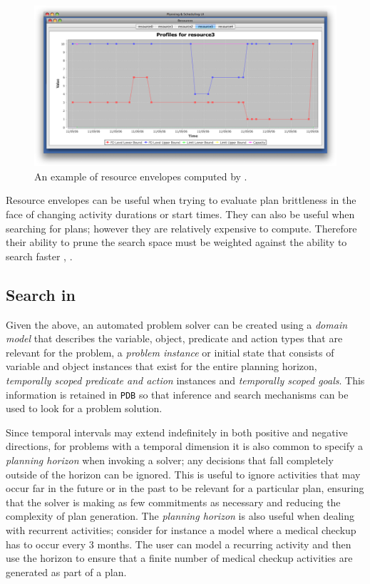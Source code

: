 \begin{figure}
\centering
\includegraphics[scale=0.2]{figs/europa-resource-envelopes.png}
\caption{\small An example of resource envelopes computed by \eu.}
\label{fig:resenvelopes}
\end{figure}

Resource envelopes can be useful when trying to evaluate plan
brittleness in the face of changing activity durations or start
times. They can also be useful when searching for plans; however they
are relatively expensive to compute. Therefore their ability to prune
the search space must be weighted against the ability to search faster
\cite{6007772}, .


\subsection{Search in \eu}
\label{sec:europa:search}

Given the above, an automated problem solver can be created using a
\emph{domain model} that describes the variable, object, predicate and
action types that are relevant for the problem, a \emph{problem
  instance} or initial state that consists of variable and object
instances that exist for the entire planning horizon, \emph{temporally
  scoped predicate and action} instances and \emph{temporally scoped
  goals}. This information is retained in \eus \texttt{PDB} so that
inference and search mechanisms can be used to look for a problem
solution.

Since temporal intervals may extend indefinitely in both positive and
negative directions, for problems with a temporal dimension it is also
common to specify a \emph{planning horizon} when invoking a solver;
any decisions that fall completely outside of the horizon can be
ignored. This is useful to ignore activities that may occur far in the future 
or in the past to be relevant for a particular plan, ensuring that the solver is making
as few commitments as necessary and reducing the complexity of plan generation.
The \emph{planning horizon} is also useful when dealing with recurrent activities;
consider for instance a model where a medical checkup has to occur
every $3$ months. The user can model a recurring activity and then use
the horizon to ensure that a finite number of medical checkup
activities are generated as part of a plan. 
